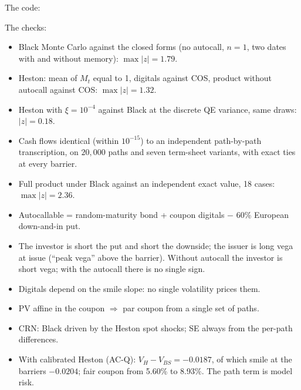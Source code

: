 \begin{progetto}[title={In the qpricer project: code and checks}]
The code:

\medskip

\noindent The checks:
\begin{itemize}
\item Black Monte Carlo against the closed forms (no autocall, $n=1$, two dates with and without memory):
$\max|z|=1.79$.
\item Heston: mean of $M_t$ equal to 1, digitals against COS, product without autocall against COS: $\max|z|=1.32$.
\item Heston with $\xi=10^{-4}$ against Black at the discrete QE variance, same draws: $|z|=0.18$.
\item Cash flows identical (within $10^{-15}$) to an independent path-by-path transcription, on $20{,}000$ paths and
seven term-sheet variants, with exact ties at every barrier.
\item Full product under Black against an independent exact value, 18 cases: $\max|z|=2.36$.
\end{itemize}
\end{progetto}

\begin{riassunto}
\begin{itemize}
\item Autocallable = random-maturity bond + coupon digitals $-$ 60\% European down-and-in put.
\item The investor is short the put and short the downside; the issuer is long vega at issue (``peak vega'' above the
barrier). Without autocall the investor is short vega; with the autocall there is no single sign.
\item Digitals depend on the smile slope: no single volatility prices them.
\item PV affine in the coupon $\Rightarrow$ par coupon from a single set of paths.
\item CRN: Black driven by the Heston spot shocks; SE always from the per-path differences.
\item With calibrated Heston (\mbox{AC-Q}): $V_H-V_{BS}=-0.0187$, of which smile at the barriers $-0.0204$; fair coupon
from 5.60\% to 8.93\%. The path term is model risk.
\end{itemize}
\end{riassunto}

